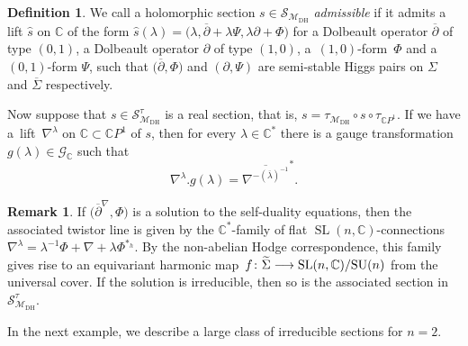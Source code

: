 \documentclass[pdftex]{sigma}
\numberwithin{equation}{section}
\theoremstyle{definition}
\newtheorem{Definition}[Theorem]{Definition}
\newtheorem{Remark}[Theorem]{Remark}
\newcommand\C{{\mathbb C}}
\begin{document}
\begin{Definition}\label{admissible}
We call a holomorphic section $s \in \mathcal S_{\mathcal{M}_{\mathrm{DH}}}$ {\it admissible} if it admits a
lift $\widehat s$ on $\mathbb C$ of the form
${\widehat s}(\lambda) = \bigl(\lambda, \overline{\partial}+\lambda \Psi, \lambda\partial+\Phi\bigr)$
for a Dolbeault operator $\overline\partial$ of type $(0,1)$, a
Dolbeault operator $\partial$ of type $(1,0)$, a~$(1,0)$-form~$\Phi$
and a $(0,1)$-form $\Psi$, such that $\bigl(\overline{\partial}, \Phi\bigr)$ and $(\partial, \Psi)$
are semi-stable Higgs pairs on $\Sigma$ and $\overline\Sigma$ respectively.
\end{Definition}

Now suppose that $s \in \mathcal S_{\mathcal{M}_{\mathrm{DH}}}^\tau$ is a real section, that is,
$s = \tau_{\mathcal{M}_{\mathrm{DH}}}\circ s\circ \tau_{\C P^1}$.
If we have a~lift~$\nabla^\lambda$ on $\mathbb C \subset \mathbb CP^1$ of $s$, then
for every $\lambda \in \mathbb C^*$ there is a gauge
transformation $g(\lambda) \in \mathcal G_\C$ such that
\[%
\nabla^\lambda.g(\lambda) = \overline{\nabla^{-(\overline{\lambda})^{-1}}}^*.
\]

\begin{Remark}\label{Rem: twistorlines}
If $\bigl(\overline\partial^\nabla, \Phi\bigr)$ is a solution to the self-duality equations, then
the associated twistor line is given by the $\C^*$-family of flat $\operatorname{SL}(n,\C)$-connections
$
\nabla^{\lambda} = \lambda^{-1}\Phi + \nabla + \lambda\Phi^{*_h}$.
By the non-abelian Hodge correspondence, this family gives rise to an equivariant harmonic
map~${f\colon \widetilde\Sigma \longrightarrow \operatorname{SL}(n,\C)/{\rm SU}(n)}$ from the universal cover.
If the solution \smash{$\bigl(\overline{\partial}^\nabla, \Phi\bigr)$} is irreducible, then so is the associated section in $\mathcal S^\tau_{\mathcal{M}_{\mathrm{DH}}}$.
\end{Remark}

In the next example, we describe a large class of irreducible sections for $n = 2$.
\end{document}
